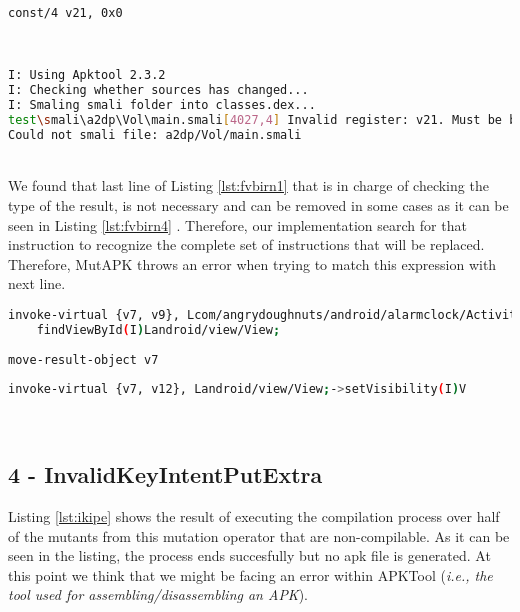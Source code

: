 \begin{minipage}{\textwidth}
	\begin{lstlisting}[language={sh}, label={lst:fvbirn2}, caption={SMALI representation of a null value being assigned}, numbers=none]
const/4 v21, 0x0
	\end{lstlisting}
\end{minipage}\\

\begin{minipage}{\textwidth}
	\begin{lstlisting}[language={sh}, label={lst:fvbirn3}, caption={APKTool console response}, numbers=none]
I: Using Apktool 2.3.2
I: Checking whether sources has changed...
I: Smaling smali folder into classes.dex...
test\smali\a2dp\Vol\main.smali[4027,4] Invalid register: v21. Must be between v0 and v15, inclusive.
Could not smali file: a2dp/Vol/main.smali
	\end{lstlisting}
\end{minipage}\\

We found that last line of Listing \ref{lst:fvbirn1} that is in charge of checking the type of the result, is not necessary and can be removed in some cases as it can be seen in Listing \ref{lst:fvbirn4} . Therefore, our implementation search for that instruction to recognize the complete set of instructions that will be replaced. Therefore, MutAPK throws an error when trying to match this expression with next line.

\begin{minipage}{\textwidth}
	\begin{lstlisting}[language={sh}, label={lst:fvbirn4}, caption={APKTool console response}, numbers=none]
invoke-virtual {v7, v9}, Lcom/angrydoughnuts/android/alarmclock/ActivityAlarmNotification;->
	findViewById(I)Landroid/view/View;
	
move-result-object v7
	
invoke-virtual {v7, v12}, Landroid/view/View;->setVisibility(I)V
	\end{lstlisting}
\end{minipage}\\

\subsection{4 - InvalidKeyIntentPutExtra}

Listing \ref{lst:ikipe} shows the result of executing the compilation process over half of the mutants from this mutation operator that are non-compilable. As it can be seen in the listing, the process ends succesfully but no apk file is generated. At this point we think that we might be facing an error within APKTool (\textit{i.e., the tool used for assembling/disassembling an APK}).

